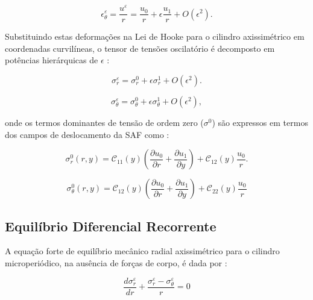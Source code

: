 \begin{equation}
  \epsilon_\theta^\varepsilon = \frac{u^\varepsilon}{r} = \frac{u_0}{r} + \epsilon \frac{u_1}{r} + O(\epsilon^2).
  \label{eq:deform_theta}
\end{equation}

Substituindo estas deformações na Lei de Hooke para o cilindro axissimétrico em coordenadas curvilíneas, o tensor de tensões oscilatório é decomposto em potências hierárquicas de $\epsilon$ \cite{bakhvalov1989}:

\begin{equation}
  \sigma_r^\varepsilon = \sigma_r^0 + \epsilon \sigma_r^1 + O(\epsilon^2).
  \label{eq:stress_r_exp}
\end{equation}

\begin{equation}
  \sigma_\theta^\varepsilon = \sigma_\theta^0 + \epsilon \sigma_\theta^1 + O(\epsilon^2),
  \label{eq:stress_theta_exp}
\end{equation}

onde os termos dominantes de tensão de ordem zero ($\sigma^0$) são expressos em termos dos campos de deslocamento da SAF como \cite{bakhvalov1989}:

\begin{equation}
  \sigma_r^0 (r, y) = \mathcal{C}_{11}(y) \left( \frac{\partial u_0}{\partial r} + \frac{\partial u_1}{\partial y} \right) + \mathcal{C}_{12}(y) \frac{u_0}{r}.
  \label{eq:stress_r_zero}
\end{equation}

\begin{equation}
  \sigma_\theta^0 (r, y) = \mathcal{C}_{12}(y) \left( \frac{\partial u_0}{\partial r} + \frac{\partial u_1}{\partial y} \right) + \mathcal{C}_{22}(y) \frac{u_0}{r}
  \label{eq:stress_theta_zero}
\end{equation}

\subsection{Equilíbrio Diferencial Recorrente}

A equação forte de equilíbrio mecânico radial axissimétrico para o cilindro microperiódico, na ausência de forças de corpo, é dada por \cite{bakhvalov1989}:

\begin{equation}
  \frac{d \sigma_r^\varepsilon}{d r} + \frac{\sigma_r^\varepsilon - \sigma_\theta^\varepsilon}{r} = 0
  \label{eq:equil_original}
\end{equation}

